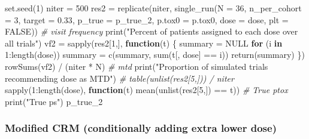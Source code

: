 \documentclass[
]{article}
\newenvironment{Shaded}{\begin{snugshade}}{\end{snugshade}}
\newcommand{\AttributeTok}[1]{\textcolor[rgb]{0.77,0.63,0.00}{#1}}
\newcommand{\CommentTok}[1]{\textcolor[rgb]{0.56,0.35,0.01}{\textit{#1}}}
\newcommand{\ConstantTok}[1]{\textcolor[rgb]{0.00,0.00,0.00}{#1}}
\newcommand{\ControlFlowTok}[1]{\textcolor[rgb]{0.13,0.29,0.53}{\textbf{#1}}}
\newcommand{\DecValTok}[1]{\textcolor[rgb]{0.00,0.00,0.81}{#1}}
\newcommand{\FloatTok}[1]{\textcolor[rgb]{0.00,0.00,0.81}{#1}}
\newcommand{\FunctionTok}[1]{\textcolor[rgb]{0.00,0.00,0.00}{#1}}
\newcommand{\NormalTok}[1]{#1}
\newcommand{\OtherTok}[1]{\textcolor[rgb]{0.56,0.35,0.01}{#1}}
\newcommand{\SpecialCharTok}[1]{\textcolor[rgb]{0.00,0.00,0.00}{#1}}
\newcommand{\StringTok}[1]{\textcolor[rgb]{0.31,0.60,0.02}{#1}}
\begin{document}
\begin{Shaded}
\begin{Highlighting}[]
\FunctionTok{set.seed}\NormalTok{(}\DecValTok{1}\NormalTok{)}
\NormalTok{niter }\OtherTok{=} \DecValTok{500}
\NormalTok{res2 }\OtherTok{=} \FunctionTok{replicate}\NormalTok{(niter, }\FunctionTok{single\_run}\NormalTok{(}\AttributeTok{N =} \DecValTok{36}\NormalTok{, }\AttributeTok{n\_per\_cohort =} \DecValTok{3}\NormalTok{, }\AttributeTok{target =} \FloatTok{0.33}\NormalTok{, }\AttributeTok{p\_true =}\NormalTok{ p\_true\_2, }\AttributeTok{p.tox0 =}\NormalTok{ p.tox0, }\AttributeTok{dose =}\NormalTok{ dose, }\AttributeTok{plt =} \ConstantTok{FALSE}\NormalTok{))}
\CommentTok{\# visit frequency}
\FunctionTok{print}\NormalTok{(}\StringTok{"Percent of patients assigned to each dose over all trials"}\NormalTok{)}
\NormalTok{vf2 }\OtherTok{=} \FunctionTok{sapply}\NormalTok{(res2[}\DecValTok{1}\NormalTok{,], }\ControlFlowTok{function}\NormalTok{(t) \{}
\NormalTok{summary }\OtherTok{=} \ConstantTok{NULL}
\ControlFlowTok{for}\NormalTok{ (i }\ControlFlowTok{in} \DecValTok{1}\SpecialCharTok{:}\FunctionTok{length}\NormalTok{(dose)) summary }\OtherTok{=} \FunctionTok{c}\NormalTok{(summary, }\FunctionTok{sum}\NormalTok{(t[, }\StringTok{\textquotesingle{}dose\textquotesingle{}}\NormalTok{] }\SpecialCharTok{==}\NormalTok{ i))}
\FunctionTok{return}\NormalTok{(summary)}
\NormalTok{\})}
\FunctionTok{rowSums}\NormalTok{(vf2) }\SpecialCharTok{/}\NormalTok{ (niter }\SpecialCharTok{*}\NormalTok{ N)}
\CommentTok{\# mtd}
\FunctionTok{print}\NormalTok{(}\StringTok{"Proportion of simulated trials recommending dose as MTD"}\NormalTok{)}
\CommentTok{\# table(unlist(res2[5,])) / niter}
\FunctionTok{sapply}\NormalTok{(}\DecValTok{1}\SpecialCharTok{:}\FunctionTok{length}\NormalTok{(dose), }\ControlFlowTok{function}\NormalTok{(t) }\FunctionTok{mean}\NormalTok{(}\FunctionTok{unlist}\NormalTok{(res2[}\DecValTok{5}\NormalTok{,]) }\SpecialCharTok{==}\NormalTok{ t))}
\CommentTok{\# True ptox}
\FunctionTok{print}\NormalTok{(}\StringTok{"True p\textquotesingle{}s"}\NormalTok{)}
\NormalTok{p\_true\_2}
\end{Highlighting}
\end{Shaded}

\hypertarget{modified-crm-conditionally-adding-extra-lower-dose}{%
\subsubsection{Modified CRM (conditionally adding extra lower
dose)}\label{modified-crm-conditionally-adding-extra-lower-dose}}
\end{document}

